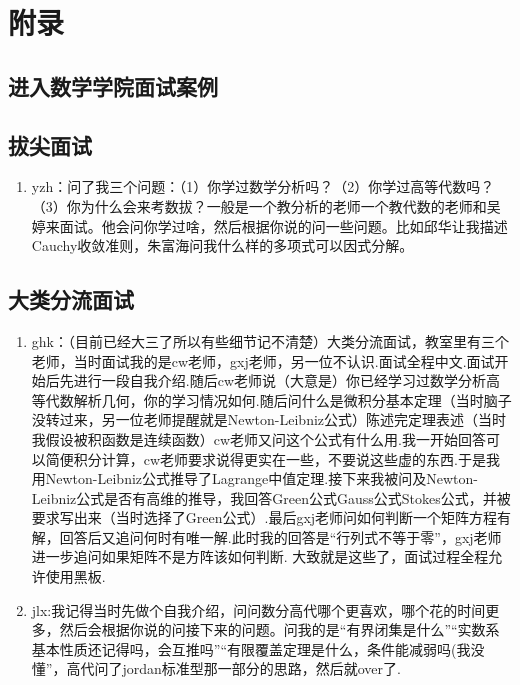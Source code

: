 \documentclass[a4paper,11pt,notitlepage]{article}
\begin{document}
\section*{附录}
\begin{appendices}
\section{进入数学学院面试案例}\label{进入数学学院面试案例}

\subsection{拔尖面试}\label{拔尖面试详细}
\begin{adjustwidth}{2em}{0pt}
\begin{enumerate}
    \item yzh：问了我三个问题：（1）你学过数学分析吗？（2）你学过高等代数吗？（3）你为什么会来考数拔？一般是一个教分析的老师一个教代数的老师和吴婷来面试。他会问你学过啥，然后根据你说的问一些问题。比如邱华让我描述Cauchy收敛准则，朱富海问我什么样的多项式可以因式分解。
\end{enumerate}
\end{adjustwidth}

\subsection{大类分流面试}\label{大类分流面试详细}
\begin{adjustwidth}{2em}{0pt}
\begin{enumerate}
    \item ghk：（目前已经大三了所以有些细节记不清楚）大类分流面试，教室里有三个老师，当时面试我的是cw老师，gxj老师，另一位不认识.面试全程中文.面试开始后先进行一段自我介绍.随后cw老师说（大意是）你已经学习过数学分析高等代数解析几何，你的学习情况如何.随后问什么是微积分基本定理（当时脑子没转过来，另一位老师提醒就是Newton-Leibniz公式）陈述完定理表述（当时我假设被积函数是连续函数）cw老师又问这个公式有什么用.我一开始回答可以简便积分计算，cw老师要求说得更实在一些，不要说这些虚的东西.于是我用Newton-Leibniz公式推导了Lagrange中值定理.接下来我被问及Newton-Leibniz公式是否有高维的推导，我回答Green公式Gauss公式Stokes公式，并被要求写出来（当时选择了Green公式）.最后gxj老师问如何判断一个矩阵方程有解，回答后又追问何时有唯一解.此时我的回答是“行列式不等于零”，gxj老师进一步追问如果矩阵不是方阵该如何判断. 大致就是这些了，面试过程全程允许使用黑板.
    \item jlx:我记得当时先做个自我介绍，问问数分高代哪个更喜欢，哪个花的时间更多，然后会根据你说的问接下来的问题。问我的是“有界闭集是什么”“实数系基本性质还记得吗，会互推吗”“有限覆盖定理是什么，条件能减弱吗(我没懂”，高代问了jordan标准型那一部分的思路，然后就over了.
\end{enumerate}
\end{adjustwidth}


\end{appendices}
\end{document}
